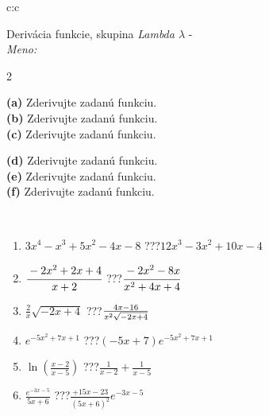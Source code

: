 \documentclass[10pt]{report}
\begin{document}
\newpage
\thispagestyle{empty}
\begin{tabular}{c:c}
\begin{minipage}[c][104.5mm][t]{0.5\linewidth}
\begin{center}
\vspace{7mm}
{\huge Derivácia funkcie, skupina \textit{Lambda $\lambda$} -}\\[5mm]
\textit{Meno:}\phantom{xxxxxxxxxxxxxxxxxxxxxxxxxxxxxxxxxxxxxxxxxxxxxxxxxxxxxxxxxxxxxxxxx}\\[5mm]
\begin{minipage}{0.95\linewidth}
\begin{center}
{\small \begin{multicols}{2} \raggedright
\textbf{(a)} Zderivujte zadanú funkciu. \\[1mm]
\textbf{(b)} Zderivujte zadanú funkciu. \\[1mm]
\textbf{(c)} Zderivujte zadanú funkciu. \par \columnbreak
\textbf{(d)} Zderivujte zadanú funkciu. \\[1mm]
\textbf{(e)} Zderivujte zadanú funkciu. \\[1mm]
\textbf{(f)} Zderivujte zadanú funkciu.
\end{multicols}
}
\end{center}
\end{minipage}
\\[4mm]
\begin{minipage}{0.79\linewidth}
\begin{center}
\begin{varwidth}{\linewidth}
\begin{enumerate}
\normalsize
\item $3x^4-x^3+5x^2-4x-8$\quad \dotfill\; ???\;\dotfill \quad $12x^3-3x^2+10x-4$
\item $\cfrac{-2x^2+2x+4}{x+2}$\quad \dotfill\; ???\;\dotfill \quad $\cfrac{-2x^2-8x}{x^2+4x+4}$
\item $\frac{2}{x}\sqrt{-2x+4}$\quad \dotfill\; ???\;\dotfill \quad $\frac{4x-16}{x^2 \sqrt{\smash[b]{-2x+4}}}$
\item $e^{-5x^2+7x+1}$\quad \dotfill\; ???\;\dotfill \quad $(-5x+7)e^{-5x^2+7x+1}$
\item $\ln{\left(\frac{x-2}{x-5}\right)}$\quad \dotfill\; ???\;\dotfill \quad $\frac{1}{x-2}+\frac{1}{x-5}$
\item $\frac{e^{-3x-5}}{5x+6}$\quad \dotfill\; ???\;\dotfill \quad $\frac{+15x-23}{(5x+6)^2}e^{-3x-5}$
\end{enumerate}

\end{varwidth}
\end{center}
\end{minipage}
\end{center}
\end{minipage}
\end{tabular}
\end{document}

